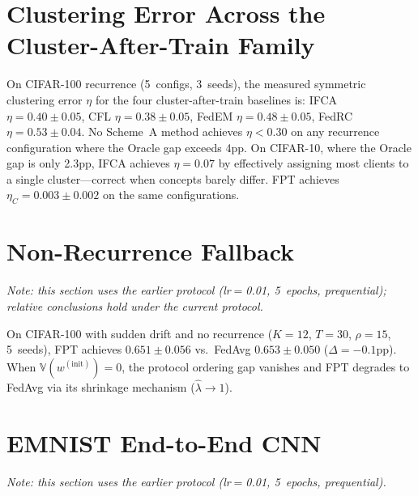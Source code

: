 \documentclass[11pt]{article}
\newcommand{\V}{\mathbb{V}}
\begin{document}
\section{Clustering Error Across the Cluster-After-Train Family}
\label{app:eta_full}

On CIFAR-100 recurrence (5~configs, 3~seeds), the measured symmetric clustering error $\eta$ for the four cluster-after-train baselines is:
IFCA $\eta = 0.40 \pm 0.05$,
CFL $\eta = 0.38 \pm 0.05$,
FedEM $\eta = 0.48 \pm 0.05$,
FedRC $\eta = 0.53 \pm 0.04$.
No Scheme~A method achieves $\eta < 0.30$ on any recurrence configuration where the Oracle gap exceeds 4pp.
On CIFAR-10, where the Oracle gap is only 2.3pp, IFCA achieves $\eta = 0.07$ by effectively assigning most clients to a single cluster---correct when concepts barely differ.
FPT achieves $\eta_C = 0.003 \pm 0.002$ on the same configurations.


\section{Non-Recurrence Fallback}
\label{app:nonrecurrence}

\emph{Note: this section uses the earlier protocol (lr$=$0.01, 5~epochs, prequential); relative conclusions hold under the current protocol.}

On CIFAR-100 with sudden drift and no recurrence ($K{=}12$, $T{=}30$, $\rho{=}15$, 5~seeds), FPT achieves $0.651 \pm 0.056$ vs.\ FedAvg $0.653 \pm 0.050$ ($\Delta = -0.1$pp).
When $\V(w^{(\mathrm{init})}) = 0$, the protocol ordering gap vanishes and FPT degrades to FedAvg via its shrinkage mechanism ($\hat\lambda \to 1$).


\section{EMNIST End-to-End CNN}
\label{app:emnist}

\emph{Note: this section uses the earlier protocol (lr$=$0.01, 5~epochs, prequential).}
\end{document}

